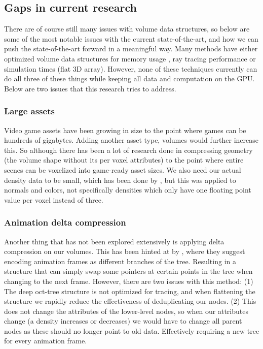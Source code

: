\subsection{Gaps in current research} \label{related_work:gaps_in_current_research}
There are of course still many issues with volume data structures, so below are some of the most notable issues with the current state-of-the-art, and how we can push the state-of-the-art forward in a meaningful way. Many methods have either optimized volume data structures for memory usage \cite{laine2010efficient}\cite{kampe2013high}, ray tracing performance \cite{van2015real} \cite{soderlund2022ray} \cite{museth2013vdb} or simulation times (flat 3D array). However, none of these techniques currently can do all three of these things while keeping all data and computation on the GPU. Below are two issues that this research tries to address.
\subsubsection{Large assets} \label{related_work:gaps_in_current_research:large_assets}
Video game assets have been growing in size to the point where games can be hundreds of gigabytes. Adding another asset type, volumes would further increase this. So although there has been a lot of research done in compressing geometry (the volume shape without its per voxel attributes) to the point where entire scenes can be voxelized into game-ready asset sizes\cite{van2015real}\cite{museth2013vdb}. We also need our actual density data to be small, which has been done by \cite{dado2016geometry}, but this was applied to normals and colors, not specifically densities which only have one floating point value per voxel instead of three.
\subsubsection{Animation delta compression} \label{related_work:gaps_in_current_research:animation_delta_compression}
Another thing that has not been explored extensively is applying delta compression on our volumes. This has been hinted at by \cite{careil2020interactively}, where they suggest encoding animation frames as different branches of the tree. Resulting in a structure that can simply swap some pointers at certain points in the tree when changing to the next frame. However, there are two issues with this method: (1) The deep oct-tree structure is not optimized for tracing, and when flattening the structure we rapidly reduce the effectiveness of deduplicating our nodes. (2) This does not change the attributes of the lower-level nodes, so when our attributes change (a density increases or decreases) we would have to change all parent nodes as these should no longer point to old data. Effectively requiring a new tree for every animation frame.